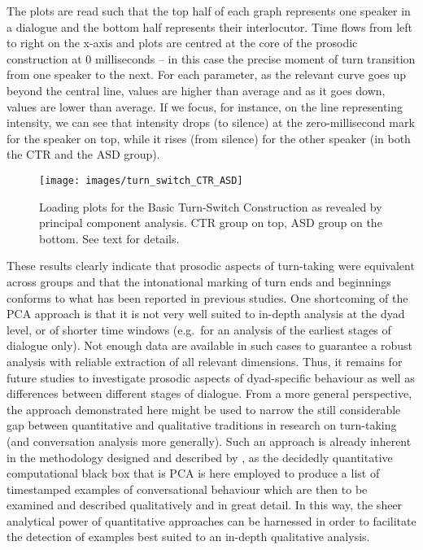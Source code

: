 The plots are read such that the top half of each graph represents one speaker in a dialogue and the bottom half represents their interlocutor. Time flows from left to right on the x-axis and plots are centred at the core of the prosodic construction at 0 milliseconds -- in this case the precise moment of turn transition from one speaker to the next. For each parameter, as the relevant curve goes up beyond the central line, values are higher than average and as it goes down, values are lower than average. If we focus, for instance, on the line representing intensity, we can see that intensity drops (to silence) at the zero-millisecond mark for the speaker on top, while it rises (from silence) for the other speaker (in both the CTR and the ASD group).



\begin{figure}

{\centering \texttt{[image: images/turn\_switch\_CTR\_ASD]}
	
}

\caption{Loading plots for the Basic Turn-Switch Construction as revealed by principal component analysis. CTR group on top, ASD group on the bottom. See text for details.}\label{fig:TurnConstruction}
\end{figure}

These results clearly indicate that prosodic aspects of turn-taking were equivalent across groups and that the intonational marking of turn ends and beginnings conforms to what has been reported in previous studies. One shortcoming of the PCA approach is that it is not very well suited to in-depth analysis at the dyad level, or of shorter time windows (e.g.~for an analysis of the earliest stages of dialogue only). Not enough data are available in such cases to guarantee a robust analysis with reliable extraction of all relevant dimensions. Thus, it remains for future studies to investigate prosodic aspects of dyad-specific behaviour as well as differences between different stages of dialogue. From a more general perspective, the approach demonstrated here might be used to narrow the still considerable gap between quantitative and qualitative traditions in research on turn-taking (and conversation analysis more generally). Such an approach is already inherent in the methodology designed and described by \citet{wardProsodicPatternsEnglish2019}, as the decidedly quantitative computational black box that is PCA is here employed to produce a list of timestamped examples of conversational behaviour which are then to be examined and described qualitatively and in great detail. In this way, the sheer analytical power of quantitative approaches can be harnessed in order to facilitate the detection of examples best suited to an in-depth qualitative analysis. 






